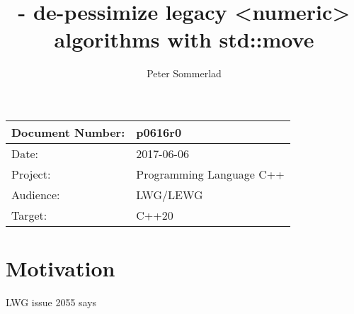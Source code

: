 \documentclass[ebook,11pt,article]{memoir}
\title{\papernumber{} - de-pessimize legacy {<numeric>} algorithms with std::move}
\author{Peter Sommerlad}
\date{\paperdate}                        %
\newcommand{\papernumber}{p0616r0}
\newcommand{\paperdate}{2017-06-06}
\begin{document}
\maketitle
\begin{tabular}[t]{|l|l|}\hline 
Document Number:& \papernumber  \\\hline
Date: & \paperdate \\\hline
Project: & Programming Language C++\\\hline 
Audience: & LWG/LEWG\\\hline
Target: & C++20\\\hline
\end{tabular}

\chapter{Motivation}
LWG issue 2055 says
\end{document}
